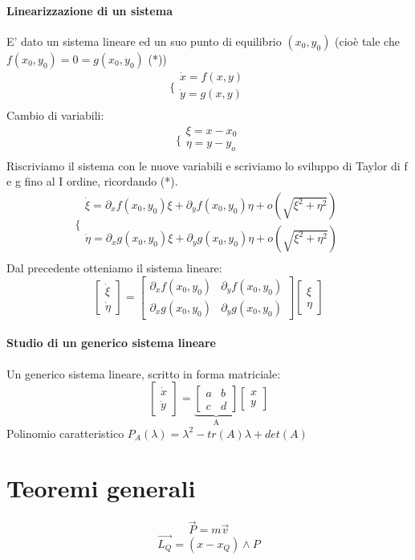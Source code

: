 \documentclass[a4paper,12pt]{article}
\begin{document}
\paragraph{Linearizzazione di un sistema}
E' dato un sistema lineare ed un suo punto di equilibrio $(x_0,y_0)$ (cioè tale che $f(x_0,y_0)=0=g(x_0,y_0)$ (*))
$$\bigg\{ \begin{array}{l}
\dot{x} = f(x,y)\\
\dot{y} = g(x,y)\\
\end{array}$$
Cambio di variabili:
$$\bigg\{ \begin{array}{l}
\xi = x-x_0\\
\eta = y-y_o\\
\end{array}$$
Riscriviamo il sistema con le nuove variabili e scriviamo lo sviluppo di Taylor di f e g fino al I ordine, ricordando (*).
$$\bigg\{ \begin{array}{l}
\dot{\xi} = \partial_xf(x_0,y_0)\xi+\partial_yf(x_0,y_0)\eta + o(\sqrt{\xi^2+\eta^2})\\
\dot{\eta} = \partial_xg(x_0,y_0)\xi+\partial_yg(x_0,y_0)\eta + o(\sqrt{\xi^2+\eta^2})\\
\end{array}$$ 
Dal precedente otteniamo il sistema lineare: 
$$\begin{bmatrix}\dot{\xi} \\ \dot{\eta} \end{bmatrix} 
= \begin{bmatrix} \partial_xf(x_0,y_0) & \partial_yf(x_0,y_0) \\ \partial_xg(x_0,y_0) & \partial_yg(x_0,y_0) \end{bmatrix} \begin{bmatrix}\xi \\ \eta \end{bmatrix}
$$
\paragraph{Studio di un generico sistema lineare}
Un generico sistema lineare, scritto in forma matriciale:
$$\begin{bmatrix}\dot{x} \\ \dot{y} \end{bmatrix} 
=  \underbrace{\begin{bmatrix} a & b \\ c & d \end{bmatrix}}_\text{A}  \begin{bmatrix}x \\ y \end{bmatrix}
$$
Polinomio caratteristico $P_A(\lambda) = \lambda^2-tr(A)\lambda+det(A)$
\section{Teoremi generali}
\paragraph{}
$$
\vec{P} = m\vec{v}$$
$$
\vec{L_Q} = (x-x_Q)\wedge P
$$
\end{document}

